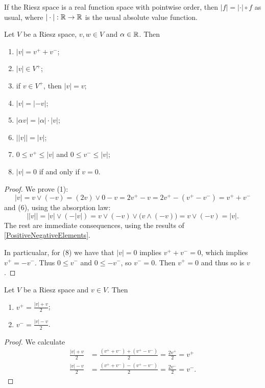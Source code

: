 If the Riesz space is a real function space with pointwise order, then $|f| = |\cdot|\circ f$ as usual, where $|\cdot|: \mathbb{R}\to \mathbb{R}$ is the usual absolute value function.

\begin{lemma} \label{absoluteValue}
Let $V$ be a Riesz space, $v,w\in V$ and $\alpha\in \mathbb{R}$. Then
\begin{enumerate}
\item $|v| = v^+ + v^-$;
\item $|v| \in V^+$;
\item if $v\in V^+$, then $|v| = v$;
\item $|v| = |-v|$;
\item $|\alpha v| = |\alpha|\cdot |v|$;
\item $\big||v|\big| = |v|$;
\item $0 \leq v^+ \leq |v|$ and $0 \leq v^- \leq |v|$;
\item $|v| = 0$ \textup{if and only if} $v = 0$.
\end{enumerate}
\end{lemma}
\begin{proof}
We prove (1):
\[ |v| = v\vee (-v) = (2v)\vee 0 - v = 2v^+ - v = 2v^+ - (v^+ - v^-) = v^+ + v^- \]
and (6), using the absorption law:
\[ \big||v|\big| = |v|\vee (-|v|) = v \vee (-v) \vee \big( v\wedge (-v) \big) = v \vee (-v) = |v|. \]
The rest are immediate consequences, using the results of \ref{PositiveNegativeElements}.

In particualar, for (8) we have that $|v|=0$ implies $v^+ + v^- = 0$, which implies $v^+ = -v^-$. Thus $0\leq v^-$ and $0\leq -v^-$, so $v^- = 0$. Then $v^+ = 0$ and thus so is $v$.
\end{proof}

\begin{lemma} \label{positiveNegativePartAverage}
Let $V$ be a Riesz space and $v\in V$. Then
\begin{enumerate}
\item $\displaystyle v^+ = \frac{|v|+v}{2}$;
\item $\displaystyle v^- = \frac{|v|-v}{2}$.
\end{enumerate}
\end{lemma}
\begin{proof}
We calculate
\begin{align*}
\frac{|v|+v}{2} &= \frac{(v^+ + v^-) + (v^+ - v^-)}{2} = \frac{2v^+}{2} = v^+ \\
\frac{|v|-v}{2} &= \frac{(v^+ + v^-) - (v^+ - v^-)}{2} = \frac{2v^-}{2} = v^-.
\end{align*}
\end{proof}

